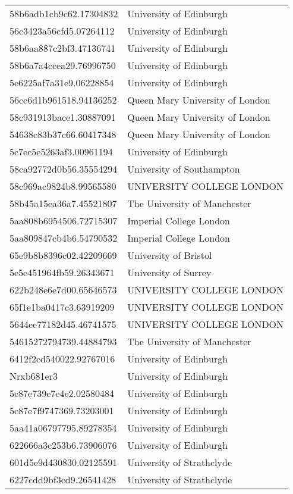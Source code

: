 \begin{tabular}{ll}
58b6adb1cb9c62.17304832 & University of Edinburgh \\
56c3423a56cfd5.07264112 & University of Edinburgh \\
58b6aa887c2bf3.47136741 & University of Edinburgh \\
58b6a7a4ccea29.76996750 & University of Edinburgh \\
5e6225af7a31e9.06228854 & University of Edinburgh \\
56cc6d1b961518.94136252 & Queen Mary University of London \\
58c931913bace1.30887091 & Queen Mary University of London \\
54638c83b37c66.60417348 & Queen Mary University of London \\
5c7ec5e5263af3.00961194 & University of Edinburgh \\
58ca92772d0b56.35554294 & University of Southampton \\
58c969ac9824b8.99565580 & UNIVERSITY COLLEGE LONDON \\
58b45a15ea36a7.45521807 & The University of Manchester \\
5aa808b6954506.72715307 & Imperial College London \\
5aa809847cb4b6.54790532 & Imperial College London \\
65e9b8b8396c02.42209669 & University of Bristol \\
5e5e451964fb59.26343671 & University of Surrey \\
622b248e6e7d00.65646573 & UNIVERSITY COLLEGE LONDON \\
65f1e1ba0417c3.63919209 & UNIVERSITY COLLEGE LONDON \\
5644ee77182d45.46741575 & UNIVERSITY COLLEGE LONDON \\
54615272794739.44884793 & The University of Manchester \\
6412f2cd540022.92767016 & University of Edinburgh \\
Nrxb681er3 & University of Edinburgh \\
5c87e739e7e4e2.02580484 & University of Edinburgh \\
5c87e7f9747369.73203001 & University of Edinburgh \\
5aa41a06797795.89278354 & University of Edinburgh \\
622666a3c253b6.73906076 & University of Edinburgh \\
601d5e9d430830.02125591 & University of Strathclyde \\
6227cdd9bf3cd9.26541428 & University of Strathclyde \\

\end{tabular}
